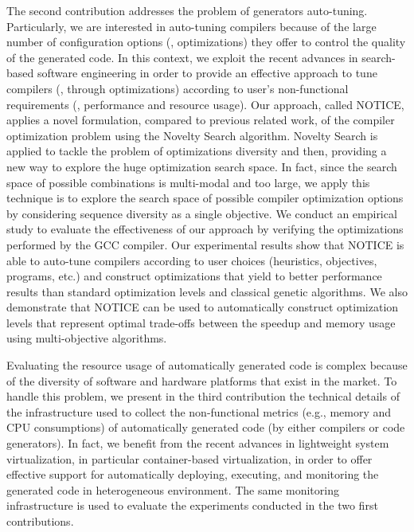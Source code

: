 The second contribution addresses the problem of generators auto-tuning. Particularly, we are interested in auto-tuning compilers because of the large number of configuration options (\ie, optimizations) they offer to control the quality of the generated code. In this context, we exploit the recent advances in search-based software engineering in order to provide an effective approach to tune compilers (\ie, through optimizations) according to user's non-functional requirements (\ie, performance and resource usage). Our approach, called NOTICE, applies a novel formulation, compared to previous related work, of the compiler
optimization problem using the Novelty Search algorithm\cite{lehman2008exploiting}. Novelty Search is applied to tackle the
problem of optimizations diversity and then, providing a new way to explore the huge optimization search space. In fact, since the search
space of possible combinations is multi-modal\cite{bodin1998iterative} and too large, we apply this technique is to explore the search space of possible compiler optimization options by considering sequence diversity as a single objective.
We conduct an empirical study to evaluate the effectiveness of our approach by verifying the optimizations performed by the GCC compiler. Our experimental results show that NOTICE is able to auto-tune compilers according to user choices (heuristics, objectives, programs, etc.) and construct optimizations that yield to better performance results than standard optimization levels and classical genetic algorithms. We also demonstrate that NOTICE can be used to automatically construct optimization levels that represent optimal trade-offs between the speedup and memory usage using multi-objective algorithms.

Evaluating the resource usage of automatically generated code is complex because of the diversity of software and hardware platforms that exist in the market. To handle this problem, we present in the third contribution the technical details of the infrastructure used to collect the non-functional metrics (e.g., memory and CPU consumptions) of automatically generated code (by either compilers or code generators). In fact, we benefit from the recent advances in lightweight system virtualization, in particular container-based virtualization, in order to offer effective support for automatically deploying, executing, and monitoring the generated code in heterogeneous environment.
The same monitoring infrastructure is used to evaluate the experiments conducted in the two first contributions.

